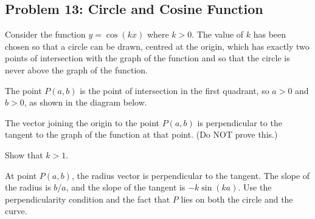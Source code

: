 \subsection{Problem 13: Circle and Cosine Function}

\begin{problem}
Consider the function $y=\cos(kx)$ where $k>0$. The value of $k$ has been chosen so that a circle can be drawn, centred at the origin, which has exactly two points of intersection with the graph of the function and so that the circle is never above the graph of the function.

The point $P(a, b)$ is the point of intersection in the first quadrant, so $a>0$ and $b>0$, as shown in the diagram below.

\vspace{0.5em}
\noindent
\begin{center}
\end{center}
\vspace{0.3em}

The vector joining the origin to the point $P(a, b)$ is perpendicular to the tangent to the graph of the function at that point. (Do NOT prove this.)

Show that $k>1$.
\end{problem}

\begin{hint}
At point $P(a,b)$, the radius vector is perpendicular to the tangent. The slope of the radius is $b/a$, and the slope of the tangent is $-k\sin(ka)$. Use the perpendicularity condition and the fact that $P$ lies on both the circle and the curve.
\end{hint}

